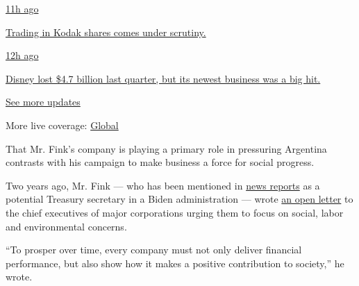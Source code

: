 \href{https://www.nytimes3xbfgragh.onion/live/2020/08/04/business/stock-market-today-coronavirus?action=click\&pgtype=Article\&state=default\&region=MAIN_CONTENT_1\&context=storylines_live_updates\#trading-in-kodak-shares-comes-under-scrutiny}{11h
ago}

\href{https://www.nytimes3xbfgragh.onion/live/2020/08/04/business/stock-market-today-coronavirus?action=click\&pgtype=Article\&state=default\&region=MAIN_CONTENT_1\&context=storylines_live_updates\#trading-in-kodak-shares-comes-under-scrutiny}{Trading
in Kodak shares comes under scrutiny.}

\href{https://www.nytimes3xbfgragh.onion/live/2020/08/04/business/stock-market-today-coronavirus?action=click\&pgtype=Article\&state=default\&region=MAIN_CONTENT_1\&context=storylines_live_updates\#disney-lost-4-7-billion-last-quarter-but-its-newest-business-was-a-big-hit}{12h
ago}

\href{https://www.nytimes3xbfgragh.onion/live/2020/08/04/business/stock-market-today-coronavirus?action=click\&pgtype=Article\&state=default\&region=MAIN_CONTENT_1\&context=storylines_live_updates\#disney-lost-4-7-billion-last-quarter-but-its-newest-business-was-a-big-hit}{Disney
lost \$4.7 billion last quarter, but its newest business was a big hit.}

\href{https://www.nytimes3xbfgragh.onion/live/2020/08/04/business/stock-market-today-coronavirus?action=click\&pgtype=Article\&state=default\&region=MAIN_CONTENT_1\&context=storylines_live_updates}{See
more updates}

More live coverage:
\href{https://www.nytimes3xbfgragh.onion/2020/08/04/world/coronavirus-cases.html?action=click\&pgtype=Article\&state=default\&region=MAIN_CONTENT_1\&context=storylines_live_updates}{Global}

That Mr. Fink's company is playing a primary role in pressuring
Argentina contrasts with his campaign to make business a force for
social progress.

Two years ago, Mr. Fink --- who has been mentioned in
\href{https://www.cnbc.com/2020/04/06/biden-donors-float-elizabeth-warren-larry-fink-others-for-key-roles.html}{news
reports} as a potential Treasury secretary in a Biden administration ---
wrote
\href{http://www.corporance.es/wp-content/uploads/2018/01/Larry-Fink-letter-to-CEOs-2018-1.pdf}{an
open letter} to the chief executives of major corporations urging them
to focus on social, labor and environmental concerns.

``To prosper over time, every company must not only deliver financial
performance, but also show how it makes a positive contribution to
society,'' he wrote.

